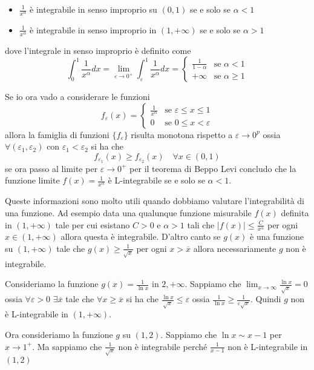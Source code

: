 \begin{itemize}[label = --]
    \item \(\frac{1}{x^{\alpha}}\) è integrabile in senso improprio su
        \({(0,1)}\) se e solo se \(\alpha<1\) 
    \item \(\frac{1}{x^{\alpha}}\) è integrabile in senso improprio in
        \({(1,+\infty)}\) se e solo se \(\alpha>1\)
\end{itemize}
dove l'integrale in senso improprio è definito come
\[
    \int_{0}^{1} \frac{1}{x^{\alpha}} dx = \lim_{\varepsilon \to 0^{+}}
    \int_{\varepsilon}^{1} \frac{1}{x^{\alpha}} dx = \begin{cases}
        \frac{1}{1-\alpha} & \text{se } \alpha < 1 \\
        +\infty & \text{se } \alpha \ge 1
    \end{cases}
\]

Se io ora vado a considerare le funzioni
\[
    f_{\varepsilon} {(x)} = \begin{cases}
        \frac{1}{x^{\alpha}} & \text{se } \varepsilon \le x\le 1 \\
        0 & \text{se } 0 \le x < \varepsilon
    \end{cases}
\]
allora la famiglia di funzioni \(\{f_\varepsilon\} \) risulta monotona rispetto
a \(\varepsilon \to 0^{p}\) ossia \(\forall {(\varepsilon_{1},
\varepsilon_{2})}\) con \(\varepsilon_{1} < \varepsilon_{2}\) si ha che 
\[
    f_{\varepsilon_{1}}{(x)} \ge f_{\varepsilon_{2}}{(x)} \quad \forall x \in
    {(0,1)}
\]
se ora passo al limite per \(\varepsilon \to 0^{+}\) per il teorema di Beppo
Levi concludo che la funzione limite \(f{(x)} = \frac{1}{x^{\alpha}}\) è
L-integrabile se e solo se \(\alpha < 1\).

Queste informazioni sono molto utili quando dobbiamo valutare l'integrabilità di
una funzione. Ad esempio data una qualunque funzione misurabile \(f{(x)}\)
definita in \({(1, +\infty)}\) tale per cui esistano \(C > 0\) e \(\alpha > 1\)
tali che \(\left| f{(x)} \right| \le \frac{C}{x^{\alpha}}\) per ogni \(x \in
{(1, +\infty)}\) allora questa è integrabile. D'altro canto se \(g{(x)}\) è una
funzione su \({(1, +\infty)}\) tale che \(g{(x)} \ge \frac{1}{\sqrt{x}}\) per
ogni \(x > \overline{x}\) allora necessariamente \(g\) non è integrabile.

\begin{example}
    Consideriamo la funzione \(g{(x)} = \frac{1}{\ln x}\) in \(2,
    +\infty\). Sappiamo che \(\lim_{x \to \infty} \frac{\ln x}{\sqrt{x}} = 0\) ossia
    \(\forall \varepsilon > 0\) \(\exists \overline{x}\) tale che \(\forall x \ge
    \overline{x}\) si ha che \(\frac{\ln x}{\sqrt{x}} \le \varepsilon\) ossia
    \(\frac{1}{\ln x} \ge \frac{1}{\varepsilon \sqrt{x}}\). Quindi \(g\) non è
    L-integrabile in \((1, +\infty)\). 

    Ora consideriamo la funzione \(g\) su \({(1, 2)}\). Sappiamo che \(\ln x
    \sim x- 1\) per \(x \to 1^{+}\). Ma sappiamo che \(\frac{1}{\sqrt{x}}\) non
    è integrabile perché \(\frac{1}{x-1}\) non è L-integrabile in \({(1, 2)}\) 
\end{example}

